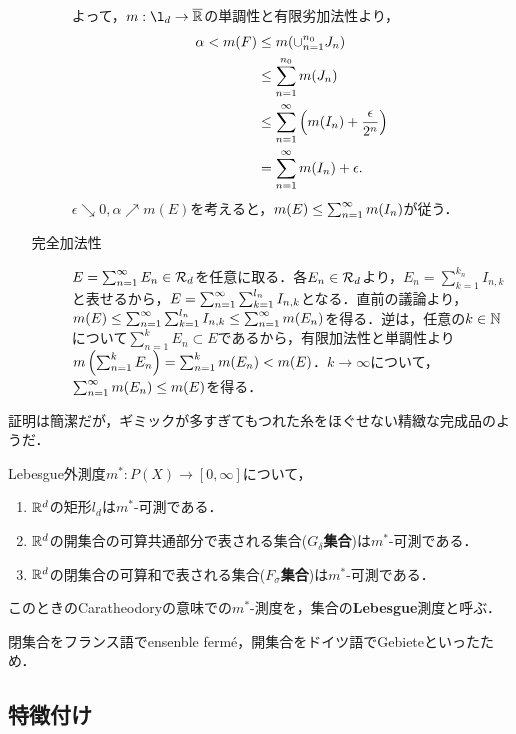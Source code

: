 \documentclass[uplatex, dvipdfmx]{jsreport}
\begin{document}
\begin{Proof}
\begin{enumerate}
\begin{description}
            よって，$m:\l_d\to\o{\R}$の単調性と有限劣加法性より，
            \begin{align*}
                \alpha<m(F)&\le m(\cup_{n=1}^{n_0}J_n)\\
                &\le\sum_{n=1}^{n_0}m(J_n)\\
                &\le\sum_{n=1}^\infty\left(m(I_n)+\frac{\epsilon}{2^n}\right)\\
                &=\sum_{n=1}^\infty m(I_n)+\epsilon.
            \end{align*}
            $\epsilon\searrow 0,\alpha\nearrow m(E)$を考えると，$m(E)\le\sum_{n=1}^\infty m(I_n)$が従う．
            \item[完全加法性]
            $E=\sum_{n=1}^\infty E_n\in\mathcal{R}_d$を任意に取る．各$E_n\in\mathcal{R}_d$より，$E_n=\sum_{k=1}^{k_n}I_{n,k}$と表せるから，$E=\sum_{n=1}^\infty\sum_{k=1}^{l_n}I_{n,k}$となる．直前の議論より，$m(E)\le\sum_{n=1}^\infty\sum_{k=1}^{l_n}I_{n,k}\le\sum_{n=1}^\infty m(E_n)$を得る．逆は，任意の$k\in\mathbb{N}$について$\sum^k_{n=1}E_n\subset E$であるから，有限加法性と単調性より$m\left(\sum_{n=1}^kE_n\right)=\sum_{n=1}^km(E_n)<m(E)$．$k\to\infty$について，$\sum_{n=1}^\infty m(E_n)\le m(E)$を得る．
        \end{description}
    \end{enumerate}
\end{Proof}
\begin{remarks}
    証明は簡潔だが，ギミックが多すぎてもつれた糸をほぐせない精緻な完成品のようだ．
\end{remarks}

\begin{proposition}[Lebesgue可測集合の例]
    Lebesgue外測度$m^*:P(X)\to[0,\infty]$について，
    \begin{enumerate}
        \item $\mathbb{R}^d$の矩形$l_d$は$m^*$-可測である．
        \item $\mathbb{R}^d$の開集合の可算共通部分で表される集合(\textbf{$G_\delta$集合})は$m^*$-可測である．
        \item $\mathbb{R}^d$の閉集合の可算和で表される集合(\textbf{$F_\sigma$集合})は$m^*$-可測である．
    \end{enumerate}
    このときのCaratheodoryの意味での$m^*$-測度を，集合の\textbf{Lebesgue}測度と呼ぶ．
\end{proposition}
\begin{remark}
    閉集合をフランス語でensenble fermé，開集合をドイツ語でGebieteといったため．
\end{remark}

\subsection{特徴付け}
\end{document}
